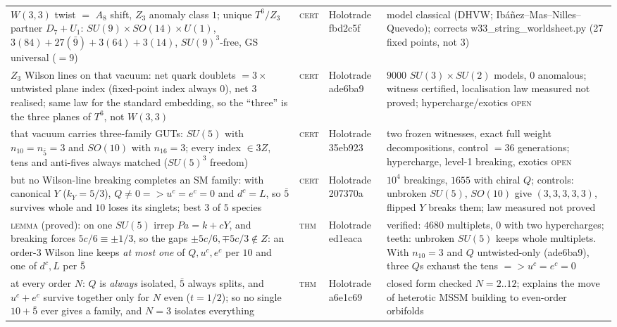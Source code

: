 \documentclass[12pt,a4paper]{article}
\def\mathbb#1{#1}%
\def\texttt#1{#1}%
\def\cdot{ }%
\def\Rightarrow{ => }%
\theoremstyle{definition}
\newcommand{\ZZ}{\mathbb{Z}}
\begin{document}
\begin{center}
\begin{tabular}{@{}p{}llp{}@{}}
$W(3,3)$ twist $=$ $A_8$ shift, $\ZZ_3$ anomaly class $1$; unique $T^6/\ZZ_3$ partner $D_7{+}U_1$: $SU(9){\times}SO(14){\times}U(1)$, $3(84)+27(\bar 9)+3(64)+3(14)$, $SU(9)^3$-free, GS universal ($=9$) & \textsc{cert} & Holotrade \texttt{fbd2c5f} & model classical (DHVW; Ib\'a\~nez--Mas--Nilles--Quevedo); corrects \texttt{w33\_string\_worldsheet.py} (27 fixed points, not 3) \\
$\ZZ_3$ Wilson lines on that vacuum: net quark doublets $=3\times$ untwisted plane index (fixed-point index always $0$), net $3$ realised; same law for the standard embedding, so the ``three'' is the three planes of $T^6$, not $W(3,3)$ & \textsc{cert} & Holotrade \texttt{ade6ba9} & $9000$ $SU(3){\times}SU(2)$ models, $0$ anomalous; witness certified, localisation law measured not proved; hypercharge/exotics \textsc{open} \\
that vacuum carries three-family GUTs: $SU(5)$ with $n_{10}=n_{\bar 5}=3$ and $SO(10)$ with $n_{16}=3$; every index $\in 3\ZZ$, tens and anti-fives always matched ($SU(5)^3$ freedom) & \textsc{cert} & Holotrade \texttt{35eb923} & two frozen witnesses, exact full weight decompositions, control $=36$ generations; hypercharge, level-1 breaking, exotics \textsc{open} \\
but no Wilson-line breaking completes an SM family: with canonical $Y$ ($k_Y=5/3$), $Q\ne 0 \Rightarrow u^c=e^c=0$ and $d^c=L$, so $\bar 5$ survives whole and $10$ loses its singlets; best $3$ of $5$ species & \textsc{cert} & Holotrade \texttt{207370a} & $10^4$ breakings, $1655$ with chiral $Q$; controls: unbroken $SU(5)$, $SO(10)$ give $(3,3,3,3,3)$, flipped $Y$ breaks them; law measured not proved \\
\textsc{lemma} (proved): on one $SU(5)$ irrep $P\cdot a=k+cY$, and breaking forces $5c/6\equiv\pm 1/3$, so the gaps $\pm 5c/6,\mp 5c/3\notin\ZZ$: an order-$3$ Wilson line keeps \emph{at most one} of $Q,u^c,e^c$ per $10$ and one of $d^c,L$ per $\bar 5$ & \textsc{thm} & Holotrade \texttt{ed1eaca} & verified: $4680$ multiplets, $0$ with two hypercharges; teeth: unbroken $SU(5)$ keeps whole multiplets. With $n_{10}=3$ and $Q$ untwisted-only (\texttt{ade6ba9}), three $Q$s exhaust the tens $\Rightarrow u^c=e^c=0$ \\
at every order $N$: $Q$ is \emph{always} isolated, $\bar 5$ always splits, and $u^c{+}e^c$ survive together only for $N$ even ($t=1/2$); so no single $10+\bar 5$ ever gives a family, and $N=3$ isolates everything & \textsc{thm} & Holotrade \texttt{a6e1c69} & closed form checked $N=2..12$; explains the move of heterotic MSSM building to even-order orbifolds \\

\end{tabular}
\end{center}
\end{document}
